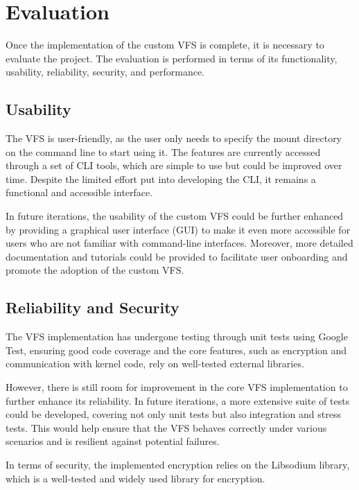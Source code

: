 \chapter{Evaluation}\label{chap:evaluation}

Once the implementation of the custom VFS is complete, it is necessary to evaluate the project.
The evaluation is performed in terms of its functionality, usability, reliability, security, and performance.


\section{Usability}\label{sec:usability}

The VFS is user-friendly, as the user only needs to specify the mount directory on the command line to start using it.
The features are currently accessed through a set of CLI tools, which are simple to use but could be improved over time.
Despite the limited effort put into developing the CLI, it remains a functional and accessible interface.

In future iterations, the usability of the custom VFS could be further enhanced by providing a graphical user interface (GUI) to make it even more accessible for users who are not familiar with command-line interfaces.
Moreover, more detailed documentation and tutorials could be provided to facilitate user onboarding and promote the adoption of the custom VFS.


\section{Reliability and Security}\label{sec:reliability-and-security}

The VFS implementation has undergone testing through unit tests using Google Test, ensuring good code coverage and the core features, such as encryption and communication with kernel code, rely on well-tested external libraries.

However, there is still room for improvement in the core VFS implementation to further enhance its reliability.
In future iterations, a more extensive suite of tests could be developed, covering not only unit tests but also integration and stress tests.
This would help ensure that the VFS behaves correctly under various scenarios and is resilient against potential failures.

In terms of security, the implemented encryption relies on the Libsodium library, which is a well-tested and widely used library for encryption.


